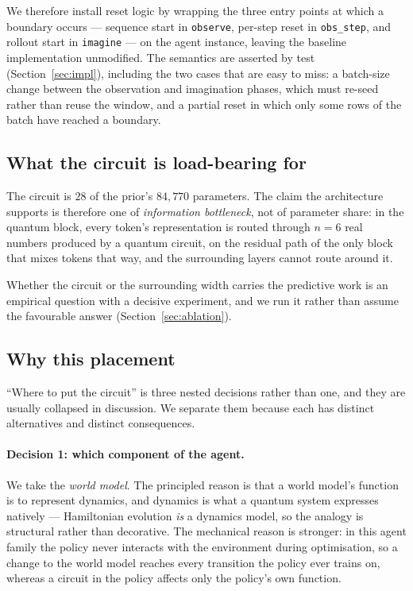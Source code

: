 \documentclass[11pt,onecolumn]{article}
\begin{document}
We therefore install reset logic by wrapping the three entry points at
which a boundary occurs --- sequence start in \texttt{observe},
per-step reset in \texttt{obs\_step}, and rollout start in
\texttt{imagine} --- on the agent instance, leaving the baseline
implementation unmodified. The semantics are asserted by test
(Section~\ref{sec:impl}), including the two cases that are easy to miss:
a batch-size change between the observation and imagination phases,
which must re-seed rather than reuse the window, and a partial reset in
which only some rows of the batch have reached a boundary.

\subsection{What the circuit is load-bearing for}\label{sec:bottleneck}
The circuit is $28$ of the prior's $84{,}770$ parameters. The claim the
architecture supports is therefore one of \emph{information bottleneck},
not of parameter share: in the quantum block, every token's
representation is routed through $n = 6$ real numbers produced by a
quantum circuit, on the residual path of the only block that mixes
tokens that way, and the surrounding layers cannot route around it.

Whether the circuit or the surrounding width carries the predictive work
is an empirical question with a decisive experiment, and we run it
rather than assume the favourable answer
(Section~\ref{sec:ablation}).

\subsection{Why this placement}\label{sec:placement}
``Where to put the circuit'' is three nested decisions rather than one,
and they are usually collapsed in discussion. We separate them because
each has distinct alternatives and distinct consequences.

\paragraph{Decision 1: which component of the agent.}
We take the \emph{world model}. The principled reason is that a world
model's function is to represent dynamics, and dynamics is what a
quantum system expresses natively --- Hamiltonian evolution \emph{is} a
dynamics model, so the analogy is structural rather than decorative. The
mechanical reason is stronger: in this agent family the policy never
interacts with the environment during optimisation, so a change to the
world model reaches every transition the policy ever trains on, whereas
a circuit in the policy affects only the policy's own function.
\end{document}
